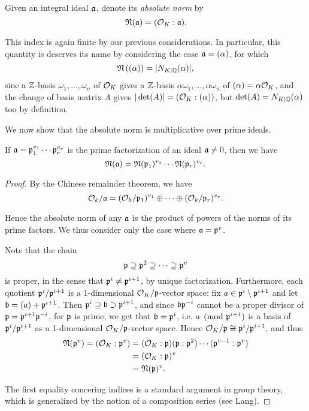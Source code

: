 Given an integral ideal $\mathfrak{a}$, denote its \emph{absolute norm} by
\[
	\mathfrak{N}(\mathfrak{a}) = (\mathcal{O}_K:\mathfrak{a}).
\]

This index is again finite by our previous considerations. In particular, this quantity is deserves its name by considering the case $\mathfrak{a}=(\alpha)$, for which
\[
	\mathfrak{N}\left((\alpha)\right) = |N_{K\mid\mathbb{Q}}(\alpha)|,
\]
sine a $\mathbb{Z}$-basis $\omega_1,\dots,\omega_n$ of $\mathcal{O}_K$ gives a $\mathbb{Z}$-basis $\alpha\omega_1,\dots,\alpha\omega_n$ of $(\alpha)=\alpha\mathcal{O}_K$, and the change of basis matrix $A$ gives $|\det(A)|=(\mathcal{O}_K:(\alpha))$, but $\det(A)=N_{K\mid\mathbb{Q}}(\alpha)$ too by definition.

We now show that the absolute norm is multiplicative over prime ideals.

\begin{prop}[Neukirch 6.1]
	If $\mathfrak{a}=\mathfrak{p}_1^{v_1}\cdots\mathfrak{p}_r^{v_r}$ is the prime factorization of an ideal $\mathfrak{a}\neq 0$, then we have
	\[
		\mathfrak{N}(\mathfrak{a}) = \mathfrak{N}(\mathfrak{p}_1)^{v_1}\cdots\mathfrak{N}(\mathfrak{p}_r)^{v_r}.
	\]
\end{prop}
\begin{proof}
	By the Chinese remainder theorem, we have
	\[
		\mathcal{O}_k/\mathfrak{a} = (\mathcal{O}_k/\mathfrak{p}_1)^{v_1}\oplus\cdots\oplus(\mathcal{O}_k/\mathfrak{p}_r)^{v_r}.
	\]
	
	Hence the absolute norm of any $\mathfrak{a}$ is the product of powers of the norms of its prime factors. We thus consider only the case where $\mathfrak{a}=\mathfrak{p}^v$.

	Note that the chain
	\[
		\mathfrak{p} \supseteq \mathfrak{p}^2 \supseteq \cdots \supseteq \mathfrak{p}^v
	\]
	is proper, in the sense that $\mathfrak{p}^i\neq\mathfrak{p}^{i+1}$, by unique factorization. Furthermore, each quotient $\mathfrak{p}^i/\mathfrak{p}^{i+1}$ is a 1-dimensional $\mathcal{O}_K/\mathfrak{p}$-vector space: fix $a\in\mathfrak{p}^i\setminus \mathfrak{p}^{i+1}$ and let $\mathfrak{b}=(a)+\mathfrak{p}^{i+1}$. Then $\mathfrak{p}^i\supseteq\mathfrak{b}\supset\mathfrak{p}^{i+1}$, and since $\mathfrak{b}\mathfrak{p}^{-i}$ cannot be a proper divisor of $\mathfrak{p}=\mathfrak{p}^{i+1}\mathfrak{p}^{-i}$, for $\mathfrak{p}$ is prime, we get that $\mathfrak{b}=\mathfrak{p}^i$, i.e. $a\pmod{\mathfrak{p}^{i+1}}$ is a basis of $\mathfrak{p}^i/\mathfrak{p}^{i+1}$ as a 1-dimensional $\mathcal{O}_K/\mathfrak{p}$-vector space. Hence $\mathcal{O}_K/\mathfrak{p}\cong\mathfrak{p}^i/\mathfrak{p}^{i+1}$, and thus
	\begin{align*}
		\mathfrak{N}(\mathfrak{p}^v) = (\mathcal{O}_K : \mathfrak{p}^v) &= (\mathcal{O}_K:\mathfrak{p})(\mathfrak{p}:\mathfrak{p}^2)\cdots(\mathfrak{p}^{v-1}:\mathfrak{p}^v)\\
			&= (\mathcal{O}_K:\mathfrak{p})^v\\
			&= \mathfrak{N}(\mathfrak{p})^v.
	\end{align*}

	The first equality concering indices is a standard argument in group theory, which is generalized by the notion of a composition series (see Lang).
\end{proof}

